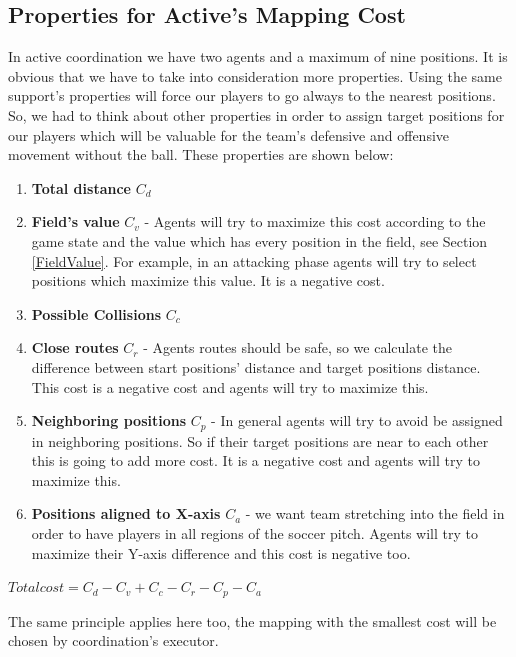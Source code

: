 \subsection{Properties for Active's Mapping Cost}
In active coordination we have two agents and a maximum of nine positions. It is obvious that we have to take into consideration more properties. Using the same support's properties will force our players to go always to the nearest positions. So, we had to think about other properties in order to assign target positions for our players which will be valuable for the team's defensive and offensive movement without the ball. These properties are shown below:
\begin{enumerate}
\item \textbf{Total distance }$C_{d}$
\item \textbf{Field's value }$C_{v}$ - Agents will try to maximize this cost according to the game state and the value which has every position in the field, see Section \ref{FieldValue}. For example, in an attacking phase agents will try to select positions which maximize this value. It is a negative cost.
\item \textbf{Possible Collisions }$C_{c}$
\item \textbf{Close routes }$C_{r}$ - Agents routes should be safe, so we calculate the difference between start positions' distance and target positions distance. This cost is a negative cost and agents will try to maximize this.
\item \textbf{Neighboring positions }$C_{p}$ - In general agents will try to avoid be assigned in neighboring positions. So if their target positions are near to each other this is going to add more cost. It is a negative cost and agents will try to maximize this.
\item \textbf{Positions aligned to X-axis }$C_{a}$ - we want team stretching into the field in order to have players in all regions of the soccer pitch. Agents will try to maximize their Y-axis difference and this cost is negative too. 
\end{enumerate}
\begin{center}
$Total cost = C_{d}-C_{v}+C_{c}-C_{r}-C_{p}-C_{a}$
\end{center}
The same principle applies here too, the mapping with the smallest cost will be chosen by coordination's executor.